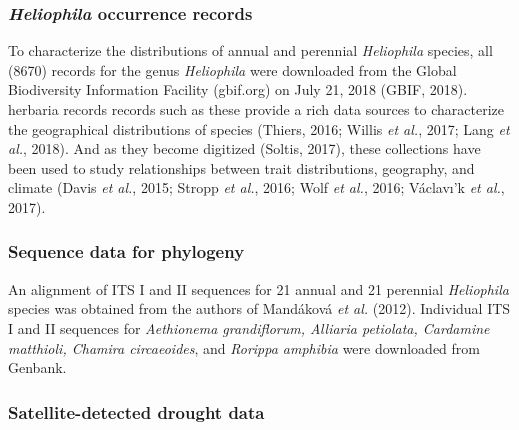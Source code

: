 \documentclass[man,floatsintext]{apa6}
\theoremstyle{definition}
\theoremstyle{definition}
\theoremstyle{definition}
\theoremstyle{remark}
\begin{document}
\hypertarget{heliophila-occurrence-records}{%
\subsubsection{\texorpdfstring{\emph{Heliophila} occurrence
records}{Heliophila occurrence records}}\label{heliophila-occurrence-records}}

To characterize the distributions of annual and perennial
\emph{Heliophila} species, all (8670) records for the genus
\emph{Heliophila} were downloaded from the Global Biodiversity
Information Facility (gbif.org) on July 21, 2018 (GBIF, 2018). herbaria
records records such as these provide a rich data sources to
characterize the geographical distributions of species (Thiers, 2016;
Willis \emph{et al.}, 2017; Lang \emph{et al.}, 2018). And as they
become digitized (Soltis, 2017), these collections have been used to
study relationships between trait distributions, geography, and climate
(Davis \emph{et al.}, 2015; Stropp \emph{et al.}, 2016; Wolf \emph{et
al.}, 2016; Václavı'k \emph{et al.}, 2017).

\hypertarget{sequence-data-for-phylogeny}{%
\subsubsection{Sequence data for
phylogeny}\label{sequence-data-for-phylogeny}}

An alignment of ITS I and II sequences for 21 annual and 21 perennial
\emph{Heliophila} species was obtained from the authors of Mandáková
\emph{et al.} (2012). Individual ITS I and II sequences for
\emph{Aethionema grandiflorum, Alliaria petiolata, Cardamine matthioli,
Chamira circaeoides}, and \emph{Rorippa amphibia} were downloaded from
Genbank.

\hypertarget{satellite-detected-drought-data}{%
\subsubsection{Satellite-detected drought
data}\label{satellite-detected-drought-data}}
\end{document}
